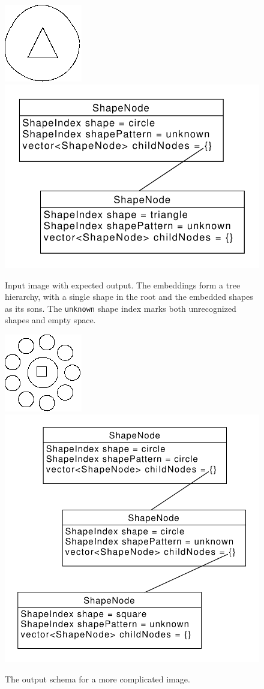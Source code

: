 \begin{description}
\begin{figure}[p]
\centering
\includegraphics[width=.3\linewidth]{ext/images/example_output0.png}
\quad
\includegraphics[width=.3\linewidth]{ext/images/example_output0.pdf}
\caption{Input image with expected output. The embeddings form a tree hierarchy, with a single shape in the root and the embedded shapes as its sons. The \texttt{unknown} shape index marks both unrecognized shapes and empty space.}
\label{fig:output0}
\end{figure}

\begin{figure}[p]
\centering
\includegraphics[width=.3\linewidth]{ext/images/example_output1.png}
\quad
\includegraphics[width=.3\linewidth]{ext/images/example_output1.pdf}
\caption{The output schema for a more complicated image. }
\label{fig:output1}
\end{figure}


\end{description}


